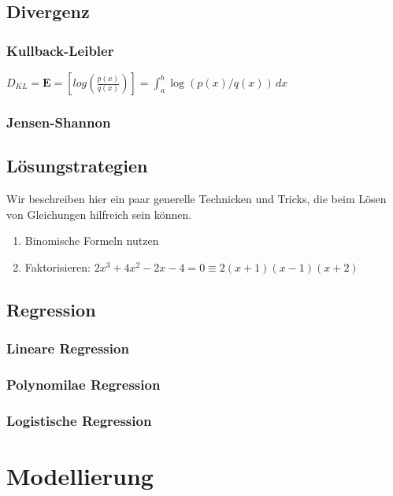 \documentclass[letterpaper, titlepage]{article}
\begin{document}
\subsection{Divergenz}\label{Divergenz}

\subsubsection{Kullback-Leibler}\label{Kullback-Leibler}
$D_{KL}=\mathbf{E}=[log(\frac{p(x)}{q(x)} )]= \int_{a}^{b}  \log (p(x)/q(x))\,dx  $

\subsubsection{Jensen-Shannon}\label{Jensen-Shannon}


\subsection{Lösungstrategien}
Wir beschreiben hier ein paar generelle Technicken und Tricks, die beim Lösen von Gleichungen hilfreich sein können. 
\begin{enumerate}
    \item Binomische Formeln nutzen 
    \item Faktorisieren: $2x^3+4x^2-2x-4=0 \equiv 2(x+1)(x-1)(x+2)$
\end{enumerate}


\subsection{Regression}\label{Regression}

\subsubsection{Lineare Regression}\label{Lineare Regression}

\subsubsection{Polynomilae Regression}\label{Polynomilae Regression}

\subsubsection{Logistische Regression}\label{Logistische Regression}


\section{Modellierung}
\end{document}
